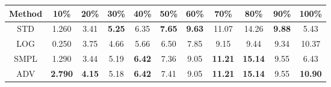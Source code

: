 \documentclass{standalone}
\begin{document}
\begin{tabular}{c|cccccccccc}
      \toprule
      Method & 10\% & 20\% & 30\% & 40\% & 50\% & 60\% & 70\% & 80\% & 90\% & 100\% \\
      \midrule
STD & 1.260 & 3.41 & \textbf{5.25} & 6.35 & \textbf{7.65} & \textbf{9.63} & 11.07 & 14.26 & \textbf{9.88} & 5.43\\
LOG & 0.250 & 3.75 & 4.66 & 5.66 & 6.50 & 7.85 & 9.15 & 9.44 & 9.34 & 10.37\\
SMPL & 1.290 & 3.44 & 5.19 & \textbf{6.42} & 7.36 & 9.05 & \textbf{11.21} & \textbf{15.14} & 9.55 & 6.43\\
ADV & \textbf{2.790} & \textbf{4.15} & 5.18 & \textbf{6.42} & 7.41 & 9.05 & \textbf{11.21} & \textbf{15.14} & 9.55 & \textbf{10.90}\\
  \bottomrule
\end{tabular}
\end{document}
